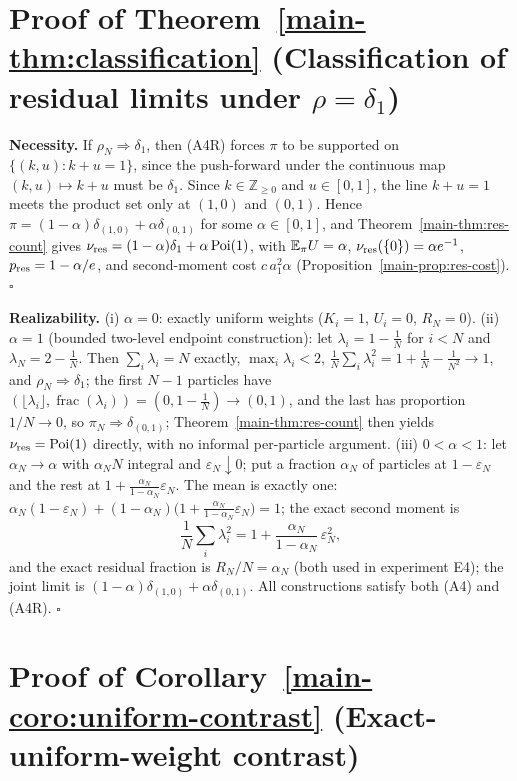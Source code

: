 \section{Proof of Theorem~\ref{main-thm:classification} (Classification of residual limits under $\rho=\delta_1$)}\label{sec:S19}

\textbf{Necessity.} If $\rho_N\Rightarrow\delta_1$, then (A4R) forces $\pi$ to be supported on $\{(k,u):k+u=1\}$, since the push-forward under the continuous map $(k,u)\mapsto k+u$ must be $\delta_1$. Since $k\in\mathbb Z_{\ge0}$ and $u\in[0,1]$, the line $k+u=1$ meets the product set only at $(1,0)$ and $(0,1)$. Hence $\pi=(1-\alpha)\delta_{(1,0)}+\alpha\delta_{(0,1)}$ for some $\alpha\in[0,1]$, and Theorem~\ref{main-thm:res-count} gives $\nu_{\rm res}=(1-\alpha)\delta_1+\alpha\operatorname{Poi}(1)$, with $\mathbb{E}_\pi U=\alpha$, $\nu_{\rm res}(\{0\})=\alpha e^{-1}$, $p_{\rm res}=1-\alpha/e$, and second-moment cost $c\,a_1^2\alpha$ (Proposition~\ref{main-prop:res-cost}). $\square$

\textbf{Realizability.} (i) $\alpha=0$: exactly uniform weights ($K_i=1$, $U_i=0$, $R_N=0$). (ii) $\alpha=1$ (bounded two-level endpoint construction): let $\lambda_i=1-\frac1N$ for $i<N$ and $\lambda_N=2-\frac1N$. Then $\sum_i\lambda_i=N$ exactly, $\max_i\lambda_i<2$, $\frac1N\sum_i\lambda_i^2=1+\frac1N-\frac1{N^2}\to1$, and $\rho_N\Rightarrow\delta_1$; the first $N-1$ particles have $(\lfloor\lambda_i\rfloor,\operatorname{frac}(\lambda_i))=(0,1-\frac1N)\to(0,1)$, and the last has proportion $1/N\to0$, so $\pi_N\Rightarrow\delta_{(0,1)}$; Theorem~\ref{main-thm:res-count} then yields $\nu_{\rm res}=\operatorname{Poi}(1)$ directly, with no informal per-particle argument. (iii) $0<\alpha<1$: let $\alpha_N\to\alpha$ with $\alpha_NN$ integral and $\varepsilon_N\downarrow0$; put a fraction $\alpha_N$ of particles at $1-\varepsilon_N$ and the rest at $1+\frac{\alpha_N}{1-\alpha_N}\varepsilon_N$. The mean is exactly one: $\alpha_N(1-\varepsilon_N)+(1-\alpha_N)\big(1+\frac{\alpha_N}{1-\alpha_N}\varepsilon_N\big)=1$; the exact second moment is
\[
\frac1N\sum_i\lambda_i^2=1+\frac{\alpha_N}{1-\alpha_N}\,\varepsilon_N^2,
\]
and the exact residual fraction is $R_N/N=\alpha_N$ (both used in experiment E4); the joint limit is $(1-\alpha)\delta_{(1,0)}+\alpha\delta_{(0,1)}$. All constructions satisfy both (A4) and (A4R). $\square$

\section{Proof of Corollary~\ref{main-coro:uniform-contrast} (Exact-uniform-weight contrast)}\label{sec:S20}

